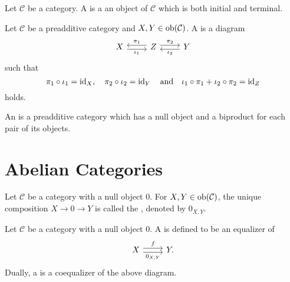 \begin{definition}
	Let $\mathcal{C}$ be a category. A  is a an object of $\mathcal{C}$ which is both initial and terminal.
\end{definition}

\begin{definition}
	Let $\mathcal{C}$ be a preadditive category and $X,Y \in \operatorname{ob}(\mathcal{C})$. A  is a diagram
	\begin{equation*}
		\begin{tikzcd}
			X \arrow[r, shift right, "\iota_1"'] & Z \arrow[r,shift left, "\pi_2"]\arrow[l,shift right,"\pi_1"'] & Y \arrow[l,shift left,"\iota_2"] 
		\end{tikzcd}
	\end{equation*}
	\noindent such that
	\begin{equation*}
		\pi_1\circ\iota_1 = \operatorname{id}_X, \quad \pi_2\circ\iota_2 = \operatorname{id}_Y \quad \text{and} \quad \iota_1 \circ \pi_1 + \iota_2 \circ \pi_2 = \operatorname{id}_Z
	\end{equation*}
	\noindent holds.
\end{definition}

\begin{definition}
	An  is a preadditive category which has a null object and a biproduct for each pair of its objects.	
\end{definition}

\section{Abelian Categories}

\begin{definition}
	Let $\mathcal{C}$ be a category with a null object $0$. For $X,Y \in \operatorname{ob}(\mathcal{C})$, the unique composition $X \to 0 \to Y$ is called the , denoted by $0_{X,Y}$.
\end{definition}

\begin{definition}
	Let $\mathcal{C}$ be a category with a null object $0$. A  is defined to be an equalizer of
	\begin{equation*}
		\begin{tikzcd}
			X \arrow[r, shift left, "f"]\arrow[r,shift right,"0_{X,Y}"'] & Y.
		\end{tikzcd}
	\end{equation*}
	Dually, a  is a coequalizer of the above diagram. 
\end{definition}

